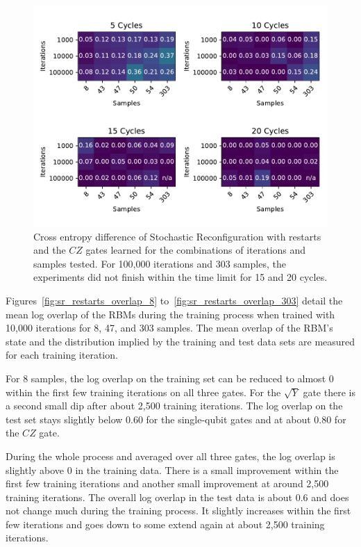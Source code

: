 \begin{figure}[H]
  \centering
  \includegraphics[width=\textwidth]{figures/results/SR-restarts-learned/fxeb_heatmap.pdf}
  \caption[Cross Entropy Difference of RBMs Trained with Stochastic Reconfiguration with Random Restarts and $CZ$ Gates Learned]{Cross entropy difference of Stochastic 
  Reconfiguration with restarts and the $CZ$ gates learned for the combinations of iterations and samples tested.
  For 100,000 iterations and 303 samples, the experiments did not finish within the time limit for 15 and 20 cycles.}
  \label{fig:sr_restarts_fxeb}
\end{figure}

Figures~\ref{fig:sr_restarts_overlap_8} to~\ref{fig:sr_restarts_overlap_303} detail the mean log overlap of the RBMs during the 
training process when trained with 10,000 iterations for 8, 47, and 303 samples. The 
mean overlap of the RBM's state and the distribution implied by the training and test data sets are measured 
for each training iteration.

For 8 samples, the log overlap on the training set can be reduced to almost 0 within the first few training iterations 
on all three gates. For the $\sqrt{Y}$ gate there is a second small dip after about 2,500 training iterations. 
The log overlap on the test set stays slightly below $0.60$ for the single-qubit gates and at about $0.80$ for the 
$CZ$ gate. 

During the whole process and averaged over all three gates, the log overlap is slightly above $0$ in the training data. There is a small 
improvement within the first few training iterations and another small improvement at around 2,500 training iterations. 
The overall log overlap in the test data is about $0.6$ and does not change much during the training process. It 
slightly increases within the first few iterations and goes down to some extend again at about 2,500 training iterations.

